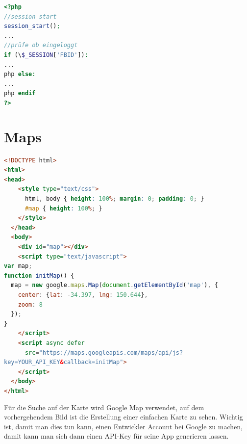 \documentclass[11pt,a4paper]{scrreprt}
\begin{document}
\begin{lstlisting}[language=PHP, frame=single, captionpos=b,caption= search\_list.php]
<?php
//session start
session_start(); 
...
//prüfe ob eingeloggt
if (\$_SESSION['FBID']):
...
php else: 
...
php endif 
?> 
\end{lstlisting}

\section{Maps}
\begin{lstlisting}[language=HTML, frame=single, captionpos=b]
<!DOCTYPE html>
<html>
<head>
    <style type="text/css">
      html, body { height: 100%; margin: 0; padding: 0; }
      #map { height: 100%; }
    </style>
  </head>
  <body>
    <div id="map"></div>
    <script type="text/javascript">
var map;
function initMap() {
  map = new google.maps.Map(document.getElementById('map'), {
    center: {lat: -34.397, lng: 150.644},
    zoom: 8
  });
}
    </script>
    <script async defer
      src="https://maps.googleapis.com/maps/api/js?
key=YOUR_API_KEY&callback=initMap">
    </script>
  </body>
</html>
\end{lstlisting}

\newpage
\noindent
Für die Suche auf der Karte wird Google Map verwendet, auf dem vorhergehendem Bild ist die Erstellung einer einfachen Karte zu sehen. Wichtig ist, damit man dies tun kann, einen Entwickler Account bei Google zu machen, damit kann man sich dann einen API-Key für seine App generieren lassen.\\
\end{document}
